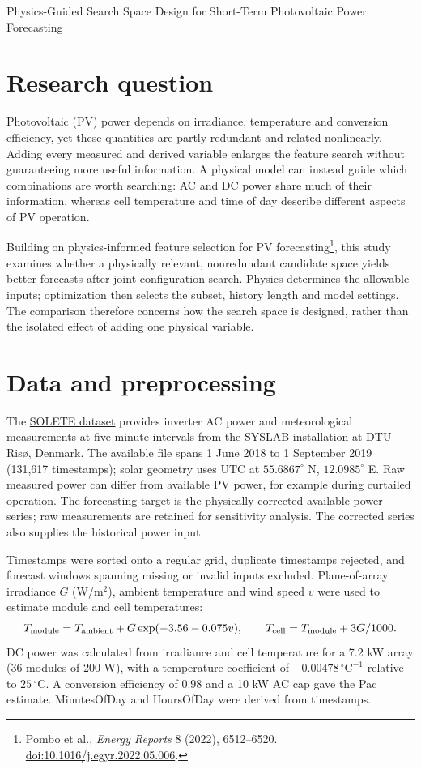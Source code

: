 \documentclass[10pt,a4paper]{article}
\begin{document}
{\LARGE\bfseries\raggedright Physics-Guided Search Space Design for Short-Term Photovoltaic Power Forecasting\par}

\section{Research question}
Photovoltaic (PV) power depends on irradiance, temperature and conversion efficiency, yet these quantities are partly redundant and related nonlinearly. Adding every measured and derived variable enlarges the feature search without guaranteeing more useful information. A physical model can instead guide which combinations are worth searching: AC and DC power share much of their information, whereas cell temperature and time of day describe different aspects of PV operation.

Building on physics-informed feature selection for PV forecasting\footnote{Pombo et al., \textit{Energy Reports} 8 (2022), 6512--6520. \href{https://doi.org/10.1016/j.egyr.2022.05.006}{doi:10.1016/j.egyr.2022.05.006}.}, this study examines whether a physically relevant, nonredundant candidate space yields better forecasts after joint configuration search. Physics determines the allowable inputs; optimization then selects the subset, history length and model settings. The comparison therefore concerns how the search space is designed, rather than the isolated effect of adding one physical variable.

\section{Data and preprocessing}
The \href{https://doi.org/10.11583/DTU.17040767}{SOLETE dataset} provides inverter AC power and meteorological measurements at five-minute intervals from the SYSLAB installation at DTU Risø, Denmark. The available file spans 1 June 2018 to 1 September 2019 (131,617 timestamps); solar geometry uses UTC at $55.6867^\circ$ N, $12.0985^\circ$ E. Raw measured power can differ from available PV power, for example during curtailed operation. The forecasting target is the physically corrected available-power series; raw measurements are retained for sensitivity analysis. The corrected series also supplies the historical power input.

Timestamps were sorted onto a regular grid, duplicate timestamps rejected, and forecast windows spanning missing or invalid inputs excluded. Plane-of-array irradiance $G$ (W/m$^2$), ambient temperature and wind speed $v$ were used to estimate module and cell temperatures:
\[
T_{\rm module}=T_{\rm ambient}+G\exp(-3.56-0.075v),\qquad
T_{\rm cell}=T_{\rm module}+3G/1000.
\]
DC power was calculated from irradiance and cell temperature for a 7.2 kW array (36 modules of 200 W), with a temperature coefficient of $-0.00478\,{}^{\circ}\mathrm{C}^{-1}$ relative to $25\,{}^{\circ}\mathrm{C}$. A conversion efficiency of 0.98 and a 10 kW AC cap gave the Pac estimate. MinutesOfDay and HoursOfDay were derived from timestamps.
\end{document}
